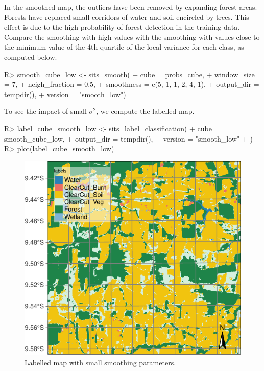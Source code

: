 \documentclass[
]{jss}
\begin{document}
In the smoothed map, the outliers have been removed by expanding forest areas. Forests have replaced small corridors of water and soil encircled by trees. This effect is due to the high probability of forest detection in the training data. Compare the smoothing with high values with the smoothing with values close to the minimum value of the 4th quartile of the local variance for each class, as computed below.

\begin{CodeChunk}
\begin{CodeInput}
R> smooth_cube_low <- sits_smooth(
+     cube = probs_cube,
+     window_size = 7,
+     neigh_fraction = 0.5,
+     smoothness = c(5, 1, 1, 2, 4, 1),
+     output_dir = tempdir(),
+     version = "smooth_low")
\end{CodeInput}
\end{CodeChunk}

To see the impact of small \(\sigma^2\), we compute the labelled map.

\begin{CodeChunk}
\begin{CodeInput}
R> label_cube_smooth_low <- sits_label_classification(
+   cube = smooth_cube_low,
+   output_dir = tempdir(),
+   version = "smooth_low"
+ )
R> plot(label_cube_smooth_low)
\end{CodeInput}
\begin{figure}[h]

{\centering \includegraphics{Bayesian_smoothing_JSS_files/figure-latex/smth2-1} 

}

\caption[Labelled map with small smoothing parameters]{Labelled map with small smoothing parameters.}\label{fig:smth2}
\end{figure}
\end{CodeChunk}
\end{document}
